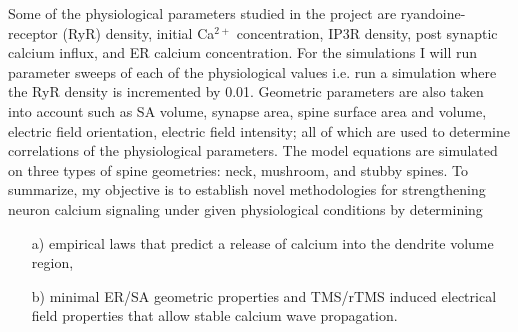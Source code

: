 \documentclass[12pt]{article}
\begin{document}
Some of the physiological parameters studied in the project are ryandoine-receptor (RyR) density, initial Ca$^{2+}$ concentration, IP3R density, post synaptic calcium influx, and ER calcium concentration. For the simulations I will run parameter sweeps of each of the physiological values i.e. run a simulation where the RyR density is incremented by 0.01. Geometric parameters are also taken into account such as SA volume, synapse area, spine surface area and volume, electric field orientation, electric field intensity; all of which are used to determine correlations of the physiological parameters.
The model equations are simulated on three types of spine geometries: neck, mushroom, and stubby spines.
To summarize, my objective is to establish novel methodologies for strengthening neuron calcium signaling under given physiological conditions by determining
\begin{itemize}
    \item [a)] empirical laws that predict a release of calcium into the dendrite volume region,
    \item [b)] minimal ER/SA geometric properties and TMS/rTMS induced electrical field properties that allow stable calcium wave propagation.
\end{itemize}
\end{document}
